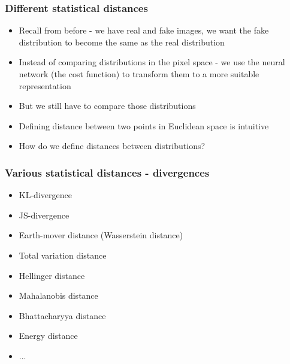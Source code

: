 \documentclass{Bredelebeamer}
\begin{document}
\begin{frame}
	\frametitle{Different statistical distances}
	\begin{itemize}[<+->]
		\item Recall from before - we have real and fake images, we want the fake distribution to become the same as the real distribution
		\item Instead of comparing distributions in the pixel space - we use the neural network (the cost function) to transform them to a more suitable representation
		\item But we still have to compare those distributions
		\item Defining distance between two points in Euclidean space is intuitive
		\item How do we define distances between distributions?
	\end{itemize}
\end{frame}
\begin{frame}
	\frametitle{Various statistical distances - divergences}
	\begin{itemize}
		\item KL-divergence
		\item JS-divergence
		\item Earth-mover distance (Wasserstein distance)
		\item Total variation distance
		\item Hellinger distance
		\item Mahalanobis distance
		\item Bhattacharyya distance
		\item Energy distance
		\item ...
	\end{itemize}
\end{frame}
\end{document}
